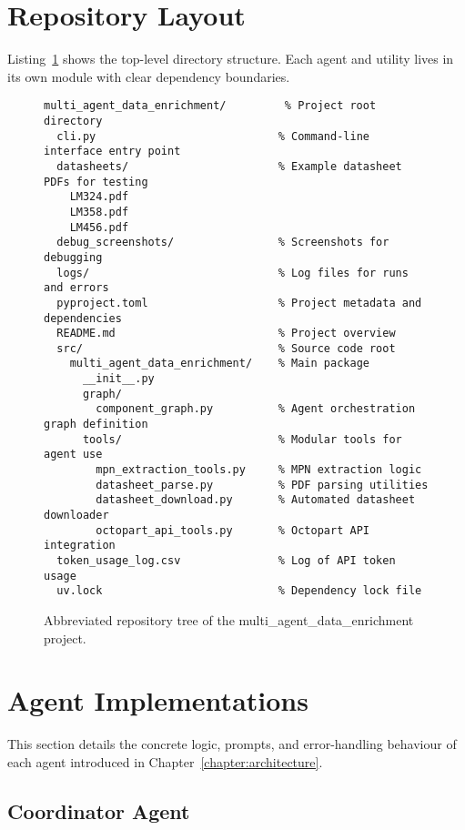 \section{Repository Layout}
Listing~\ref{lst:tree} shows the top-level directory structure.  Each agent and utility lives in its own module with clear dependency boundaries.
\begin{figure}[H]
\centering
\begin{minipage}{0.9\textwidth}
\begin{verbatim}
multi_agent_data_enrichment/         % Project root directory
  cli.py                            % Command-line interface entry point
  datasheets/                       % Example datasheet PDFs for testing
    LM324.pdf
    LM358.pdf
    LM456.pdf
  debug_screenshots/                % Screenshots for debugging
  logs/                             % Log files for runs and errors
  pyproject.toml                    % Project metadata and dependencies
  README.md                         % Project overview 
  src/                              % Source code root
    multi_agent_data_enrichment/    % Main package
      __init__.py
      graph/
        component_graph.py          % Agent orchestration graph definition
      tools/                        % Modular tools for agent use
        mpn_extraction_tools.py     % MPN extraction logic
        datasheet_parse.py          % PDF parsing utilities
        datasheet_download.py       % Automated datasheet downloader
        octopart_api_tools.py       % Octopart API integration
  token_usage_log.csv               % Log of API token usage
  uv.lock                           % Dependency lock file
\end{verbatim}
\end{minipage}
\caption{Abbreviated repository tree of the multi\_agent\_data\_enrichment project.}
\label{lst:tree}
\end{figure}

\section{Agent Implementations}
This section details the concrete logic, prompts, and error-handling behaviour of each agent introduced in Chapter~\ref{chapter:architecture}.

\subsection{Coordinator Agent}

